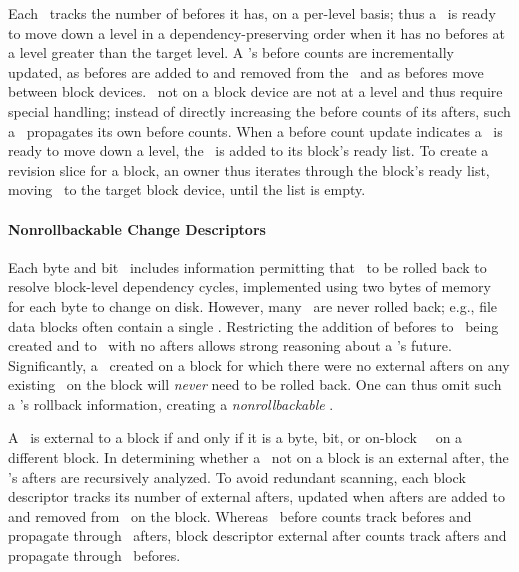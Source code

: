 Each \chdesc\ tracks the number of befores it has, on a per-level basis;
%
thus a \chdesc\ is ready to move down a level in a dependency-preserving
order when it has no befores at a level greater than the target level.
%
A \chdesc{}'s before counts are incrementally updated, as befores are
added to and removed from the \chdesc\ and as befores move between
block devices. \Noops\ not on a block device are not at a level and thus
require special handling; instead of directly increasing the before
counts of its afters, such a \noop\ propagates its own before counts.
%
When a before count update indicates a \chdesc\ is ready to move down
a level, the \chdesc\ is added to its block's ready list. To create a
revision slice for a block, an owner thus iterates through the block's
ready list, moving \chdescs\ to the target block device, until the
list is empty.

\paragraph{Nonrollbackable Change Descriptors}
%
Each byte and bit \chdesc\ includes information permitting that
\chdesc\ to be rolled back to resolve block-level dependency cycles,
implemented using two bytes of memory for each byte to change on disk.
%
However, many \chdescs\ are never rolled back; e.g., file data blocks
often contain a single \chdesc. Restricting the addition of befores to
\chdescs\ being created and to \noops\ with no afters allows strong reasoning about a \chdesc{}'s
future.  Significantly, a \chdesc\ created on a block for which there
were no external afters on any existing \chdesc\ on the block will
\textit{never} need to be rolled back. One can thus omit such a
\chdesc{}'s rollback information, creating a \textit{nonrollbackable}
\chdesc.

A \chdesc\ is external to a block if and only if it is a byte, bit, or
on-block \noop\ \chdesc\ on a different block. In determining whether a
\noop\ not on a block is an external after, the \noop{}'s afters are
recursively analyzed. To avoid redundant scanning, each block
descriptor tracks its number of external afters, updated when afters
are added to and removed from \chdescs\ on the block. Whereas \chdesc\
before counts track befores and propagate through \noop\ afters, block
descriptor external after counts track afters and propagate through
\noop\ befores.

